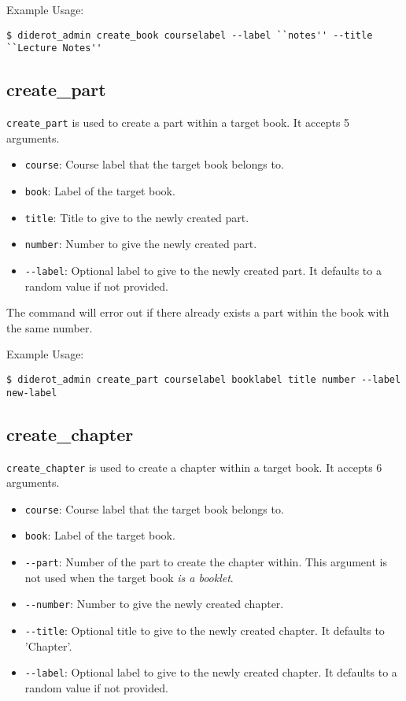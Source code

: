 Example Usage:
\begin{verbatim}
$ diderot_admin create_book courselabel --label ``notes'' --title ``Lecture Notes''
\end{verbatim}


\subsection{create\_part}

\verb|create_part| is used to create a part within a target book. It accepts 5 arguments.

\begin{itemize}
  \item \verb|course|: Course label that the target book belongs to.
  \item \verb|book|: Label of the target book.
  \item \verb|title|: Title to give to the newly created part.
  \item \verb|number|: Number to give the newly created part.
  \item \verb|--label|: Optional label to give to the newly created part. It defaults to a random value if not provided.
\end{itemize}

The command will error out if there already exists a part within the book with the same number.

Example Usage:
\begin{verbatim}
$ diderot_admin create_part courselabel booklabel title number --label new-label
\end{verbatim}


\subsection{create\_chapter}

\verb|create_chapter| is used to create a chapter within a target book. It accepts 6 arguments.

\begin{itemize}
  \item \verb|course|: Course label that the target book belongs to.
  \item \verb|book|: Label of the target book.
  \item \verb|--part|: Number of the part to create the chapter within. This argument is not used when the target book \emph{is a booklet}.
  \item \verb|--number|: Number to give the newly created chapter.
  \item \verb|--title|: Optional title to give to the newly created chapter. It defaults to 'Chapter'.
  \item \verb|--label|: Optional label to give to the newly created chapter. It defaults to a random value if not provided.
\end{itemize}

